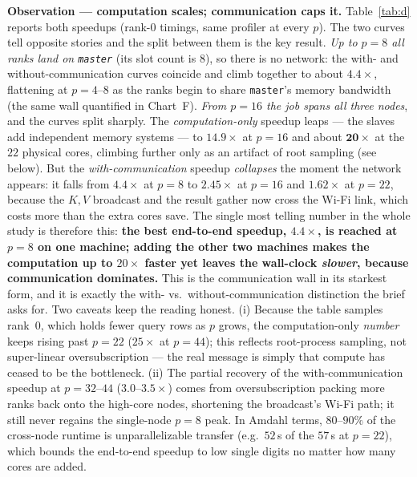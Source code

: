 \documentclass[11pt,a4paper]{article}
\newcommand{\code}[1]{\texttt{#1}}
\begin{document}
\noindent\textbf{Observation --- computation scales; communication caps it.}
Table~\ref{tab:d} reports both speedups (rank-0 timings, same profiler at every
$p$). The two curves tell opposite stories and the split between them is the key
result. \emph{Up to $p=8$ all ranks land on \code{master}} (its slot count is
$8$), so there is no network: the with- and without-communication curves coincide
and climb together to about $4.4\times$, flattening at $p=4$--$8$ as the ranks
begin to share \code{master}'s memory bandwidth (the same wall quantified in
Chart~F). \emph{From $p=16$ the job spans all three nodes}, and the curves split
sharply. The \emph{computation-only} speedup leaps --- the slaves add independent
memory systems --- to $14.9\times$ at $p=16$ and about $\mathbf{20\times}$ at the
$22$ physical cores, climbing further only as an artifact of root sampling (see
below). But the \emph{with-communication} speedup \emph{collapses} the moment the
network appears: it falls from $4.4\times$ at $p=8$ to $2.45\times$ at $p=16$ and
$1.62\times$ at $p=22$, because the $K,V$ broadcast and the result gather now cross
the Wi-Fi link, which costs more than the extra cores save. The single most telling
number in the whole study is therefore this: \textbf{the best end-to-end speedup,
$4.4\times$, is reached at $p=8$ on one machine; adding the other two machines makes
the computation up to $20\times$ faster yet leaves the wall-clock \emph{slower},
because communication dominates.} This is the communication wall in its starkest
form, and it is exactly the with- vs.\ without-communication distinction the brief
asks for. Two caveats keep the reading honest. (i) Because the table samples rank~0,
which holds fewer query rows as $p$ grows, the computation-only \emph{number} keeps
rising past $p=22$ ($25\times$ at $p=44$); this reflects root-process sampling, not
super-linear oversubscription --- the real message is simply that compute has ceased
to be the bottleneck. (ii) The partial recovery of the with-communication speedup at
$p=32$--$44$ ($3.0$--$3.5\times$) comes from oversubscription packing more ranks
back onto the high-core nodes, shortening the broadcast's Wi-Fi path; it still never
regains the single-node $p=8$ peak. In Amdahl terms, $80$--$90\%$ of the cross-node
runtime is unparallelizable transfer (e.g.\ $52$\,s of the $57$\,s at $p=22$),
which bounds the end-to-end speedup to low single digits no matter how many cores
are added.
\end{document}
